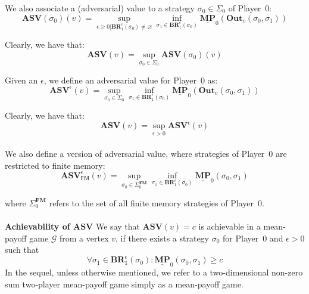 We also associate a (adversarial) value to a strategy $\sigma_0 \in \Sigma_0$ of Player~0: 
\begin{equation*}
    \mathbf{ASV}(\sigma_0)(v) = \sup\limits_{\epsilon \geqslant 0| \mathbf{BR}^{\epsilon}_1(\sigma_0) \neq \varnothing}  \inf \limits_{\sigma_1 \in \mathbf{BR}^{\epsilon}_1(\sigma_0)} \underline{\mathbf{MP}}_0(\mathbf{Out}_v(\sigma_0,\sigma_1))
\end{equation*}

Clearly, we have that:
\begin{equation*}
    \mathbf{ASV}(v) = \sup\limits_{\sigma_0 \in \Sigma_0} \mathbf{ASV}(\sigma_0)(v)
\end{equation*}

Given an $\epsilon$, we define an adversarial value for Player~0 as:
\begin{equation*}
    \mathbf{ASV}^{\epsilon}(v) = \sup\limits_{\sigma_0 \in \Sigma_0}  \inf \limits_{\sigma_1 \in \mathbf{BR}^{\epsilon}_1(\sigma_0)} \underline{\mathbf{MP}}_0(\mathbf{Out}_v(\sigma_0,\sigma_1))
\end{equation*}

Clearly, we have that:
\begin{equation*}
    \mathbf{ASV}(v) = \sup\limits_{\epsilon > 0} \mathbf{ASV}^{\epsilon}(v)
\end{equation*}
\\

We also define a version of adversarial value, where strategies of Player~0 are restricted to finite memory:
\begin{equation*}
\mathbf{ASV}^{\epsilon}_\mathsf{FM}(v) = \sup\limits_{\sigma_0 \in \Sigma_0^{\mathbf{FM}}} \inf\limits_{\sigma_1 \in \mathbf{BR}^{\epsilon}_1(\sigma_0)} \underline{\mathbf{MP}}_0(\sigma_0, \sigma_1)
\end{equation*}

where $\Sigma_0^{\mathbf{FM}}$ refers to the set of all finite memory strategies of Player~0.
\\
\\
\noindent\textbf{Achievability of $\mathbf{ASV}$} We say that $\mathbf{ASV}(v) = c$ is achievable in a mean-payoff game $\mathcal{G}$ from a vertex $v$, if there exists a strategy $\sigma_0$ for Player~0 and $\epsilon > 0$ such that
\begin{equation*}
	\forall \sigma_1 \in \mathbf{BR}^{\epsilon}_{1}(\sigma_0) : \underline{\mathbf{MP}}_0(\sigma_0, \sigma_1) \geqslant c
\end{equation*}
In the sequel, unless otherwise mentioned, we refer to a two-dimensional non-zero sum two-player mean-payoff game simply as a mean-payoff game.